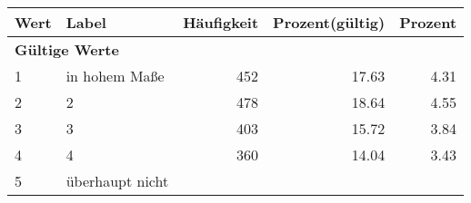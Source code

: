      \begin{longtable}{lXrrr}
     \toprule
     \textbf{Wert} & \textbf{Label} & \textbf{Häufigkeit} & \textbf{Prozent(gültig)} & \textbf{Prozent} \\
     \endhead
     \midrule
     \multicolumn{5}{l}{\textbf{Gültige Werte}}\\

     1 &
     \multicolumn{1}{X}{ in hohem Maße   } &


       \num{452} &
       \num[round-mode=places,round-precision=2]{17,63} &
         \num[round-mode=places,round-precision=2]{4,31} \\

     2 &
     \multicolumn{1}{X}{ 2   } &


       \num{478} &
       \num[round-mode=places,round-precision=2]{18,64} &
         \num[round-mode=places,round-precision=2]{4,55} \\

     3 &
     \multicolumn{1}{X}{ 3   } &


       \num{403} &
       \num[round-mode=places,round-precision=2]{15,72} &
         \num[round-mode=places,round-precision=2]{3,84} \\

     4 &
     \multicolumn{1}{X}{ 4   } &


       \num{360} &
       \num[round-mode=places,round-precision=2]{14,04} &
         \num[round-mode=places,round-precision=2]{3,43} \\

     5 &
     \multicolumn{1}{X}{ überhaupt nicht   } &



\end{longtable}
